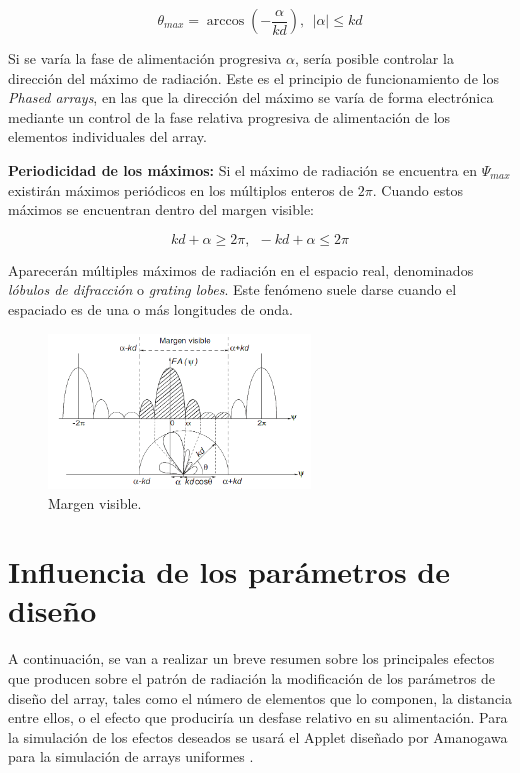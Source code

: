 \begin{itemize}
 \begin{equation}
	\theta_{max}=\arccos(-\frac{\alpha}{kd}),\ \ \left | \alpha \right |\leq kd
	\label{eq:radmax}
\end{equation}

\par Si se varía la fase de alimentación progresiva $\alpha$, sería posible controlar la dirección del máximo de radiación. Este es el principio de funcionamiento de los \textit{Phased arrays}, en las que la dirección del máximo se varía de forma electrónica mediante un control de la fase relativa progresiva de alimentación de los elementos individuales del array. 

\textbf{Periodicidad de los máximos: }Si el máximo de radiación se encuentra en $\Psi_{max}$ existirán máximos periódicos en los múltiplos enteros de $2\pi$. Cuando estos máximos se encuentran dentro del margen visible:

\begin{equation}
	kd+\alpha\geq 2\pi,\ \
-kd+\alpha\leq 2\pi  
\label{eq:maxdominio}
\end{equation}


\par Aparecerán múltiples máximos de radiación en el espacio real, denominados \textit{lóbulos de difracción} o \textit{grating lobes}. Este fenómeno suele darse cuando el espaciado es de una o más longitudes de onda.
\begin{figure}[h]
    \centering
        \includegraphics[width=0.62\textwidth]{archivos/array/margen}
        \caption{Margen visible. \cite{Cardama2002}}
        \label{fig:margenvisible}
\end{figure}

\end{itemize}



\newpage
\section{Influencia de los parámetros de diseño}
\par A continuación, se van a realizar un breve resumen sobre los principales efectos que producen sobre el patrón de radiación la modificación de los parámetros de diseño del array, tales como el número de elementos que lo componen, la distancia entre ellos, o el efecto que produciría un desfase relativo en su alimentación. Para la simulación de los efectos deseados se usará el Applet diseñado por Amanogawa para la simulación de arrays uniformes \cite{Amanogawa2019}.

